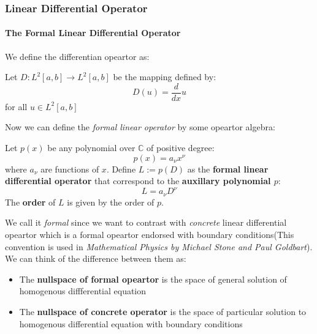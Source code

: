 \subsubsection{Linear Differential Operator}

%
\providecommand{\argmin}{\operatorname*{arg\,min}}%
\providecommand{\argmax}{\operatorname*{arg\,max}}%
\paragraph{The Formal Linear Differential Operator}

We define the differentian opeartor as:

\begin{definition}Let $D:L^2[a,b]\to L^2[a,b]$ be the mapping defined by:
\begin{equation}
D(u)=\frac{d}{dx}u
\end{equation}
for all $u\in L^2[a,b]$

\end{definition}Now we can define the \textit{formal linear operator} by some opeartor algebra:

\begin{definition}Let $p(x)$ be any polynomial over $\mathbb{C}$ of positive degree:
\begin{equation}
p(x)=a_\nu x^\nu
\end{equation}
where $a_{\nu}$ are functions of $x$. Define $L:=p(D)$ as the \textbf{formal linear differential operator} that correspond to the \textbf{auxillary polynomial $p$}:
\begin{equation}
L=a_\nu D^{\nu}
\end{equation}
The \textbf{order} of $L$ is given by the order of $p$.

\end{definition}We call it \textit{formal} since we want to contrast with \textit{concrete} linear differential opeartor which is a formal opeartor endorsed with boundary conditions(This convention is used in \textit{Mathematical Physics by Michael Stone and Paul Goldbart}). We can think of the difference between them as:

\begin{itemize}
\item The \textbf{nullspace of formal opeartor} is the space of general solution of homogenous diffferential equation
\item The \textbf{nullspace of concrete operator} is the space of particular solution to homogenous differential equation with boundary conditions
\end{itemize}

